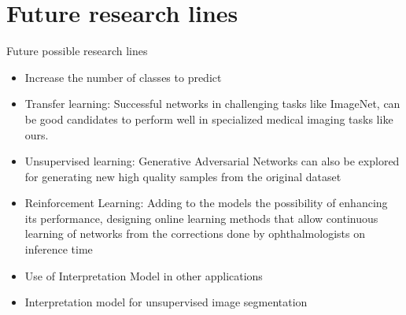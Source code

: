 \documentclass{beamer}
\begin{document}

\section{Future research lines}

\begin{frame}{Future possible research lines}{}	
\begin{itemize}
	\item Increase the number of classes to predict
	\item Transfer learning: Successful networks in challenging tasks like ImageNet, can be good candidates to perform well in specialized medical imaging tasks like ours.
	\item Unsupervised learning: Generative Adversarial Networks can also be
	explored for generating new high quality samples from the original dataset
	\item Reinforcement Learning: Adding to the models the possibility of enhancing its performance, designing online learning methods that allow continuous learning of networks from the corrections done by ophthalmologists on inference time
	\item Use of Interpretation Model in other applications
	\item Interpretation model for unsupervised image segmentation
\end{itemize}	
\end{frame}
\end{document}
